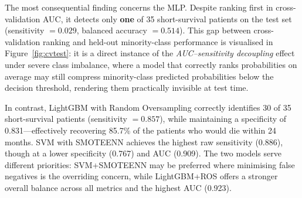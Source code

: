\documentclass[a4paper,twoside]{article}
\begin{document}
\begin{table}[ht!]
  \centering
  \caption{Held-out test set performance for each classifier under its best
    cross-validation configuration. Bold indicates the best value per metric.}
  \label{tab:test}
\end{table}

The most consequential finding concerns the MLP. Despite ranking first in
cross-validation AUC, it detects only \textbf{one} of 35 short-survival patients
on the test set (sensitivity $= 0.029$, balanced accuracy $= 0.514$). This gap
between cross-validation ranking and held-out minority-class performance is
visualised in Figure~\ref{fig:cvtest}: it is a direct instance of the
\emph{AUC--sensitivity decoupling} effect under severe class imbalance, where a
model that correctly ranks probabilities on average may still compress
minority-class predicted probabilities below the decision threshold, rendering
them practically invisible at test time.

In contrast, LightGBM with Random Oversampling correctly identifies 30 of 35
short-survival patients (sensitivity $= 0.857$), while maintaining a specificity
of 0.831—effectively recovering 85.7\% of the patients who would die within
24 months. SVM with SMOTEENN achieves the highest raw sensitivity (0.886), though at a
lower specificity (0.767) and AUC (0.909). The two models serve different
priorities: SVM+SMOTEENN may be preferred where minimising false negatives is
the overriding concern, while LightGBM+ROS offers a stronger overall balance
across all metrics and the highest AUC (0.923).
\end{document}
